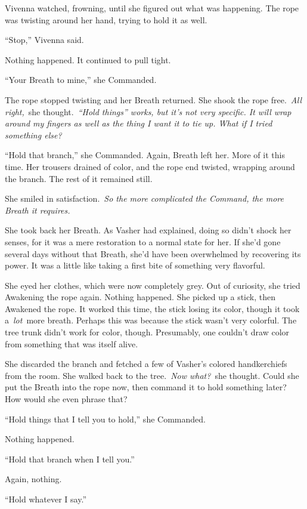 Vivenna watched, frowning, until she figured out what was happening. The rope was twisting around her hand, trying to hold it as well.

“Stop,” Vivenna said.

Nothing happened. It continued to pull tight.

“Your Breath to mine,” she Commanded.

The rope stopped twisting and her Breath returned. She shook the rope free.~\textit{All right,}~she thought.~\textit{“Hold things” works, but it’s not very specific. It will wrap around my fingers as well as the thing I want it to tie up. What if I tried something else?}

“Hold that branch,” she Commanded. Again, Breath left her. More of it this time. Her trousers drained of color, and the rope end twisted, wrapping around the branch. The rest of it remained still.

She smiled in satisfaction.~\textit{So the more complicated the Command, the more Breath it requires.}

She took back her Breath. As Vasher had explained, doing so didn’t shock her senses, for it was a mere restoration to a normal state for her. If she’d gone several days without that Breath, she’d have been overwhelmed by recovering its power. It was a little like taking a first bite of something very flavorful.

She eyed her clothes, which were now completely grey. Out of curiosity, she tried Awakening the rope again. Nothing happened. She picked up a stick, then Awakened the rope. It worked this time, the stick losing its color, though it took a~\textit{lot}~more breath. Perhaps this was because the stick wasn’t very colorful. The tree trunk didn’t work for color, though. Presumably, one couldn’t draw color from something that was itself alive.

She discarded the branch and fetched a few of Vasher’s colored handkerchiefs from the room. She walked back to the tree.~\textit{Now what?}~she thought. Could she put the Breath into the rope now, then command it to hold something later? How would she even phrase that?

“Hold things that I tell you to hold,” she Commanded.

Nothing happened.

“Hold that branch when I tell you.”

Again, nothing.

“Hold whatever I say.”

